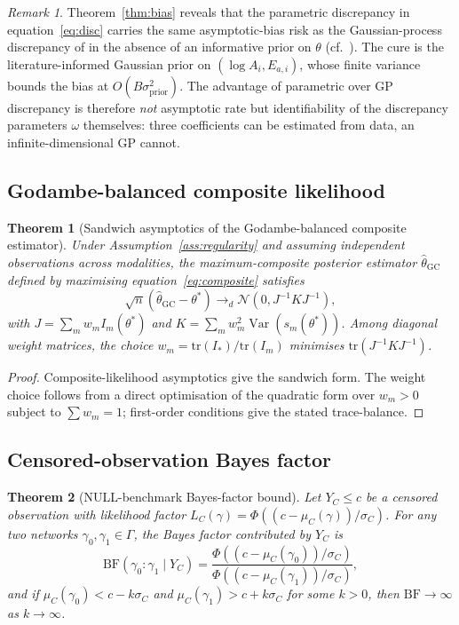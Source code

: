\documentclass[11pt]{article}
\newtheorem{theorem}{Theorem}
\theoremstyle{definition}
\theoremstyle{remark}
\newtheorem{remark}{Remark}
\newcommand{\Var}{\operatorname{Var}}
\begin{document}
\begin{remark}
Theorem~\ref{thm:bias} reveals that the parametric discrepancy in
equation~\eqref{eq:disc} carries the same asymptotic-bias risk as the
Gaussian-process discrepancy of \citet{KennedyOHagan2001} in the absence of an informative
prior on $\theta$ (cf.\ \citealp{Brynjarsdottir2014}). The cure is the literature-informed
Gaussian prior on $(\log A_i,E_{a,i})$, whose finite variance bounds the bias at
$O(B\sigma_{\mathrm{prior}}^2)$. The advantage of parametric over GP discrepancy is therefore
\emph{not} asymptotic rate but identifiability of the discrepancy parameters $\omega$
themselves: three coefficients can be estimated from data, an infinite-dimensional GP cannot.
\end{remark}

\subsection{Godambe-balanced composite likelihood}

\begin{theorem}[Sandwich asymptotics of the Godambe-balanced composite estimator]
\label{thm:composite}
Under Assumption~\ref{ass:regularity} and assuming independent observations across
modalities, the maximum-composite posterior estimator $\hat\theta_{\mathrm{GC}}$ defined by
maximising equation~\eqref{eq:composite} satisfies
\[
  \sqrt n(\hat\theta_{\mathrm{GC}}-\theta^*)\to_d \mathcal N(0,J^{-1}KJ^{-1}),
\]
with $J=\sum_m w_m I_m(\theta^*)$ and $K=\sum_m w_m^2\Var(s_m(\theta^*))$. Among diagonal
weight matrices, the choice $w_m=\mathrm{tr}(I_*)/\mathrm{tr}(I_m)$ minimises $\mathrm{tr}(J^{-1}KJ^{-1})$.
\end{theorem}

\begin{proof}
Composite-likelihood asymptotics \citep[Theorem~4]{Varin2011} give the sandwich form. The
weight choice follows from a direct optimisation of the quadratic form over $w_m>0$ subject
to $\sum w_m=1$; first-order conditions give the stated trace-balance.
\end{proof}

\subsection{Censored-observation Bayes factor}

\begin{theorem}[NULL-benchmark Bayes-factor bound]\label{thm:censored}
Let $Y_C\le c$ be a censored observation with likelihood factor
$L_C(\gamma)=\Phi((c-\mu_C(\gamma))/\sigma_C)$. For any two networks $\gamma_0,\gamma_1\in\Gamma$,
the Bayes factor contributed by $Y_C$ is
\[
  \mathrm{BF}(\gamma_0:\gamma_1\mid Y_C) = \frac{\Phi((c-\mu_C(\gamma_0))/\sigma_C)}{\Phi((c-\mu_C(\gamma_1))/\sigma_C)},
\]
and if $\mu_C(\gamma_0)<c-k\sigma_C$ and $\mu_C(\gamma_1)>c+k\sigma_C$ for some $k>0$, then
$\mathrm{BF}\to\infty$ as $k\to\infty$.
\end{theorem}
\end{document}
